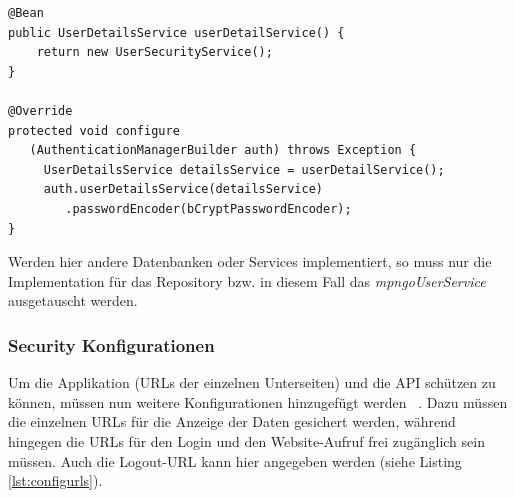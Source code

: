 \lstset{
  caption=[Konfiguration für das Spring Security UserService]{Konfiguration für das Spring Security UserService. Das Service \textit{UserSecurityService} wird nun als das zentrale Service für die Useroperationen von Spring Security verwendet.}, 
  basicstyle=\small\ttfamily, 
  label=lst:config, 
  language=Java,
  frame=single,
  breaklines=true, %
  postbreak=\mbox{\textcolor{red}{$\hookrightarrow$}\space},
}

\begin{samepage}%
	\begin{lstlisting}[float=tbhp]
@Bean
public UserDetailsService userDetailService() {
    return new UserSecurityService();
}

@Override
protected void configure
   (AuthenticationManagerBuilder auth) throws Exception {
     UserDetailsService detailsService = userDetailService();
     auth.userDetailsService(detailsService)
        .passwordEncoder(bCryptPasswordEncoder);
}
	\end{lstlisting}
\end{samepage}
Werden hier andere Datenbanken oder Services implementiert, so muss nur die Implementation für das Repository bzw. in diesem Fall das \textit{mpngoUserService} ausgetauscht werden. 
\subsubsection{Security Konfigurationen}
Um die Applikation (URLs der einzelnen Unterseiten) und die API schützen zu können, müssen nun weitere Konfigurationen hinzugefügt werden ~\parencite{springSecBook}. Dazu müssen die einzelnen URLs für die Anzeige der Daten gesichert werden, während hingegen die URLs für den Login und den Website-Aufruf frei zugänglich sein müssen. Auch die Logout-URL kann hier angegeben werden (siehe Listing \ref{lst:configurls}).
\lstset{
  caption=[Konfiguration für die Sicherheit der URLs.]{Konfiguration für die Sicherheit der URLs. Die einzelnen Paths können entweder für alle freigegeben oder für eine bestimmte Gruppe angezeigt werden. Das Abmelden wird von Spring automatisch durchgeführt.}, 
  basicstyle=\small\ttfamily, 
  label=lst:configurls, 
  language=Java,
  frame=single,
  breaklines=true, %
  postbreak=\mbox{\textcolor{red}{$\hookrightarrow$}\space},
}

